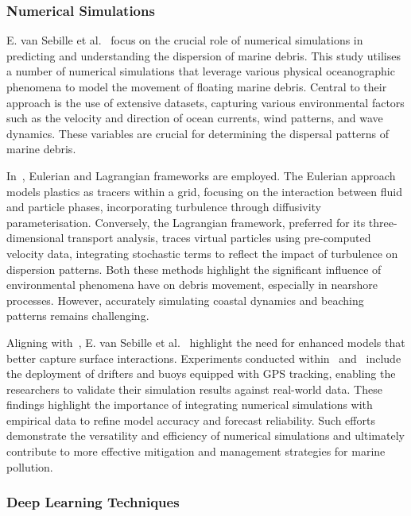 \subsubsection{Numerical Simulations}
\label{subsubsec:2.2.1.1}

E. van Sebille et al.~\cite{34} focus on the crucial role of numerical simulations in predicting and understanding the dispersion of marine debris. This study utilises a number of numerical simulations that leverage various physical oceanographic phenomena to model the movement of floating marine debris. Central to their approach is the use of extensive datasets, capturing various environmental factors such as the velocity and direction of ocean currents, wind patterns, and wave dynamics. These variables are crucial for determining the dispersal patterns of marine debris.

In~\cite{34}, Eulerian and Lagrangian frameworks are employed. The Eulerian approach models plastics as tracers within a grid, focusing on the interaction between fluid and particle phases, incorporating turbulence through diffusivity parameterisation. Conversely, the Lagrangian framework, preferred for its three-dimensional transport analysis, traces virtual particles using pre-computed velocity data, integrating stochastic terms to reflect the impact of turbulence on dispersion patterns. Both these methods highlight the significant influence of environmental phenomena have on debris movement, especially in nearshore processes. However, accurately simulating coastal dynamics and beaching patterns remains challenging.

Aligning with~\cite{35}, E. van Sebille et al.~\cite{34} highlight the need for enhanced models that better capture surface interactions. Experiments conducted within~\cite{34} and~\cite{35} include the deployment of drifters and buoys equipped with GPS tracking, enabling the researchers to validate their simulation results against real-world data. These findings highlight the importance of integrating numerical simulations with empirical data to refine model accuracy and forecast reliability. Such efforts demonstrate the versatility and efficiency of numerical simulations and ultimately contribute to more effective mitigation and management strategies for marine pollution.

\subsubsection{Deep Learning Techniques}
\label{subsubsec:2.2.1.2}

